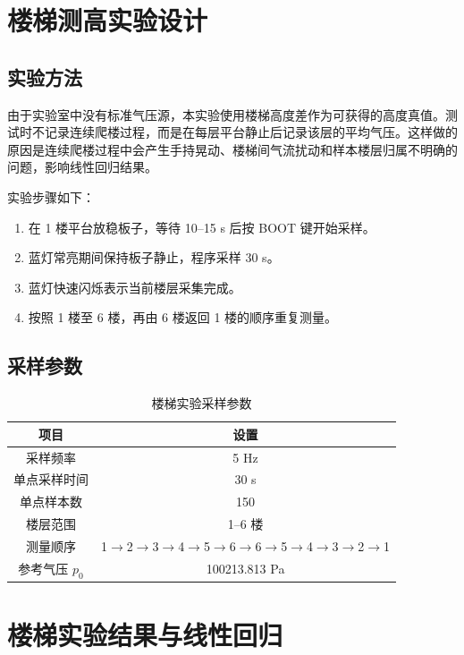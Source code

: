 \documentclass[UTF8,a4paper,12pt]{ctexart}
\begin{document}
\newpage

\section{楼梯测高实验设计}

\subsection{实验方法}

由于实验室中没有标准气压源，本实验使用楼梯高度差作为可获得的高度真值。测试时不记录连续爬楼过程，而是在每层平台静止后记录该层的平均气压。这样做的原因是连续爬楼过程中会产生手持晃动、楼梯间气流扰动和样本楼层归属不明确的问题，影响线性回归结果。

实验步骤如下：
\begin{enumerate}
  \item 在 1 楼平台放稳板子，等待 10--15 s 后按 BOOT 键开始采样。
  \item 蓝灯常亮期间保持板子静止，程序采样 30 s。
  \item 蓝灯快速闪烁表示当前楼层采集完成。
  \item 按照 1 楼至 6 楼，再由 6 楼返回 1 楼的顺序重复测量。
\end{enumerate}

\subsection{采样参数}

\begin{table}[H]
\centering
\caption{楼梯实验采样参数}
\begin{tabular}{cc}
\toprule
项目 & 设置 \\
\midrule
采样频率 & 5 Hz \\
单点采样时间 & 30 s \\
单点样本数 & 150 \\
楼层范围 & 1--6 楼 \\
测量顺序 & 1$\rightarrow$2$\rightarrow$3$\rightarrow$4$\rightarrow$5$\rightarrow$6$\rightarrow$6$\rightarrow$5$\rightarrow$4$\rightarrow$3$\rightarrow$2$\rightarrow$1 \\
参考气压 $p_0$ & 100213.813 Pa \\
\bottomrule
\end{tabular}
\end{table}

\section{楼梯实验结果与线性回归}
\end{document}
